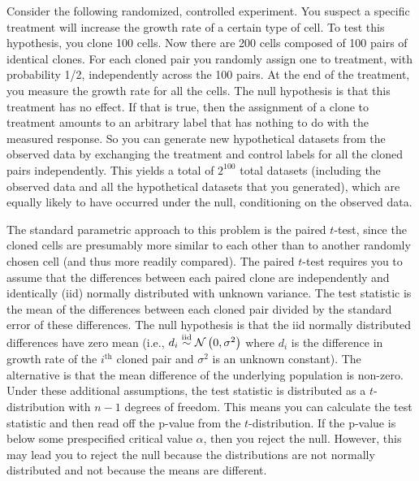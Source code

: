 

\begin{example}[label=exa:cont] Consider the following randomized, controlled
experiment.  You suspect a specific treatment will increase the growth rate of
a certain type of cell.  To test this hypothesis, you clone 100 cells. Now
there are 200 cells composed of 100 pairs of identical clones. For each cloned
pair you randomly assign one to treatment, with probability 1/2, independently
across the 100 pairs.  At the end of the treatment, you measure the growth rate
for all the cells.  The null hypothesis is that this treatment has no effect.
If that is true, then the assignment of a clone to treatment amounts to an
arbitrary label that has nothing to do with the measured response.  So you can
generate new hypothetical datasets from the observed data by exchanging the
treatment and control labels for all the cloned pairs independently.  This
yields a total of $2^{100}$ total datasets (including the observed data and all
the hypothetical datasets that you generated), which are equally likely to have
occurred under the null, conditioning on the observed data.

The standard parametric approach to this problem is the paired $t$-test, since
the cloned cells are presumably more similar to each other than to another
randomly chosen cell (and thus more readily compared).  The paired $t$-test
requires you to assume that the differences between each paired clone are
independently and identically (iid) normally distributed with unknown variance.
The test statistic is the mean of the differences between each cloned pair
divided by the standard error of these differences.  The null hypothesis is
that the iid normally distributed differences have zero mean (i.e., $d_i \stackrel{\mathrm{iid}}{\sim}
\mathcal{N}\left(0,\sigma^2\right)$ where $d_i$ is the difference in growth rate of the
$i^{\text{th}}$ cloned pair and $\sigma^2$ is an unknown constant).  The
alternative is that the mean difference of the underlying population is
non-zero.  Under these additional assumptions, the test statistic is
distributed as a $t$-distribution with $n-1$ degrees of freedom.  This means you can
calculate the test statistic and then read off the p-value from the
$t$-distribution.  If the p-value is below some prespecified critical value
$\alpha$, then you reject the null.  However, this may lead you to reject the
null because the distributions are not normally distributed and not because the
means are different.


\end{example}
